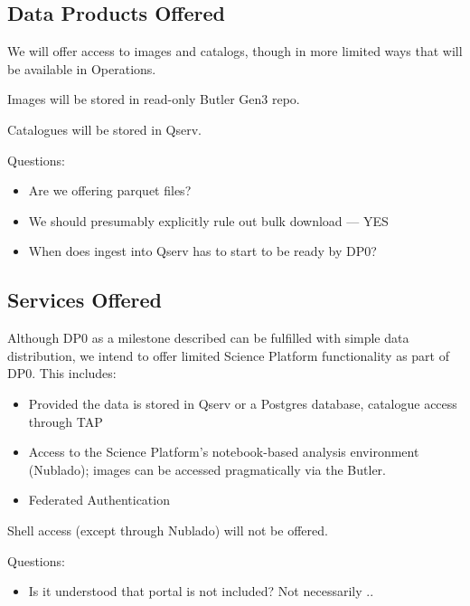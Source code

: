\subsection{Data Products Offered}

We will offer access to images and catalogs, though in more limited ways that will be available in Operations.

Images will be stored in read-only Butler Gen3 repo.

Catalogues will be stored in Qserv.

Questions:

\begin{itemize}

\item Are we offering parquet files?

\item We should presumably explicitly rule out bulk download  --- YES

\item When does ingest into Qserv has to start to be ready by DP0?

\end{itemize}

\subsection{Services Offered}

Although DP0 as a milestone described  can be fulfilled with simple data distribution, we intend to offer limited Science Platform functionality as part of DP0. This includes:

\begin{itemize}

\item Provided the data is stored in Qserv or a Postgres database, catalogue access through TAP

\item Access to the Science Platform's notebook-based analysis environment (Nublado); images can be accessed pragmatically via the Butler.

\item Federated Authentication

\end{itemize}

Shell access (except through Nublado) will not be offered.

Questions:

\begin{itemize}

\item Is it understood that portal is not included? Not necessarily ..

\end{itemize}


